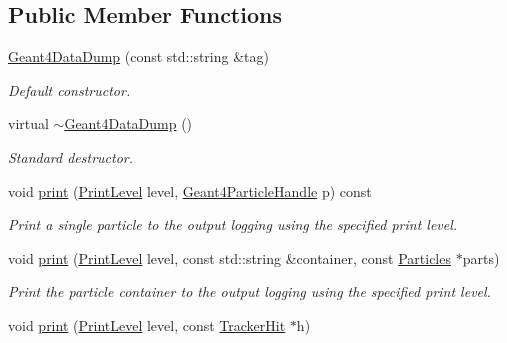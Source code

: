 \subsection*{Public Member Functions}
\begin{DoxyCompactItemize}
\item 
\hyperlink{class_d_d4hep_1_1_simulation_1_1_geant4_data_dump_a2709938040240f38f527791859ebaf34}{Geant4DataDump} (const std::string \&tag)
\begin{DoxyCompactList}\small\item\em Default constructor. \item\end{DoxyCompactList}\item 
virtual \hyperlink{class_d_d4hep_1_1_simulation_1_1_geant4_data_dump_af966fda61c5237ac2858834cdeb1e238}{$\sim$Geant4DataDump} ()
\begin{DoxyCompactList}\small\item\em Standard destructor. \item\end{DoxyCompactList}\item 
void \hyperlink{class_d_d4hep_1_1_simulation_1_1_geant4_data_dump_a2cfd1367725a0d6156c7a7195ec64ea1}{print} (\hyperlink{namespace_d_d4hep_a5b5a64d56252469451f2020a27d57d42}{PrintLevel} level, \hyperlink{class_d_d4hep_1_1_simulation_1_1_geant4_particle_handle}{Geant4ParticleHandle} p) const 
\begin{DoxyCompactList}\small\item\em Print a single particle to the output logging using the specified print level. \item\end{DoxyCompactList}\item 
void \hyperlink{class_d_d4hep_1_1_simulation_1_1_geant4_data_dump_a50918352a7c46d20e94d26b4cf5d5e39}{print} (\hyperlink{namespace_d_d4hep_a5b5a64d56252469451f2020a27d57d42}{PrintLevel} level, const std::string \&container, const \hyperlink{class_d_d4hep_1_1_simulation_1_1_geant4_data_dump_a78b5910af0db1442a14600ae8dfc2a92}{Particles} $\ast$parts)
\begin{DoxyCompactList}\small\item\em Print the particle container to the output logging using the specified print level. \item\end{DoxyCompactList}\item 
void \hyperlink{class_d_d4hep_1_1_simulation_1_1_geant4_data_dump_af3765022b8a03075fde40b2129b468e8}{print} (\hyperlink{namespace_d_d4hep_a5b5a64d56252469451f2020a27d57d42}{PrintLevel} level, const \hyperlink{class_d_d4hep_1_1_simulation_1_1_geant4_tracker_1_1_hit}{TrackerHit} $\ast$h)

\end{DoxyCompactItemize}
